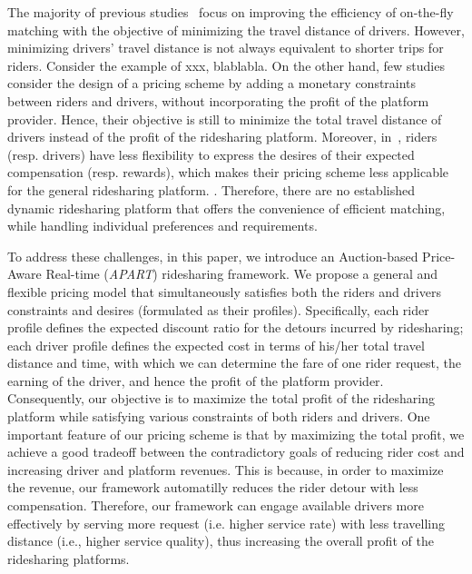 The majority of previous studies~\cite{OtaBigdata15, CiciGis15, CaoMDM15, PelzerITS15} focus on improving the efficiency of on-the-fly matching with the objective of minimizing the travel distance of drivers. However, minimizing drivers' travel distance is not always equivalent to shorter trips for riders. Consider the example of xxx, blablabla. On the other hand, few studies~\cite{Ma13, Ma15, CaoMDM15} consider the design of a pricing scheme by adding a monetary constraints between riders and drivers, without incorporating the profit of the platform provider. Hence, their objective is still to minimize the total travel distance of drivers instead of the profit of the ridesharing platform. Moreover, in~\cite{Ma13}, riders (resp. drivers) have less flexibility to express the desires of their expected compensation (resp. rewards), which makes their pricing scheme less applicable for the general ridesharing platform. . Therefore, there are no established dynamic ridesharing platform that offers the convenience of efficient matching, while handling individual preferences and requirements. 

To address these challenges, in this paper, we introduce an Auction-based Price-Aware Real-time (\textit{APART}) ridesharing framework. We propose a general and flexible pricing model that simultaneously satisfies both the riders and drivers constraints and desires (formulated as their profiles). Specifically, each rider profile defines the expected discount ratio for the detours incurred by ridesharing; each driver profile defines the expected cost in terms of his/her total travel distance and time, with which we can determine the fare of one rider request, the earning of the driver, and hence the profit of the platform provider. Consequently, our objective is to maximize the total profit of the ridesharing platform while satisfying various constraints of both riders and drivers. One important feature of our pricing scheme is that by maximizing the total profit, we achieve a good tradeoff between the contradictory goals of reducing rider cost and increasing driver and platform revenues. This is because, in order to maximize the revenue, our framework automatilly reduces the rider detour with less compensation. Therefore, our framework can engage available drivers more effectively by serving more request (i.e. higher service rate) with less travelling distance (i.e., higher service quality), thus increasing the overall profit of the ridesharing platforms.  

